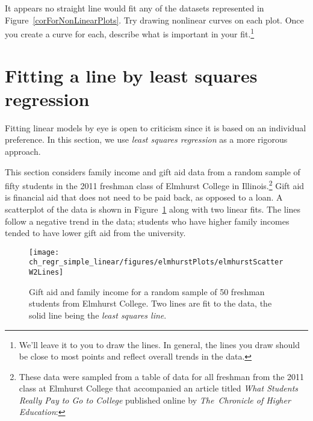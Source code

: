 \begin{exercise}
It appears no straight line would fit any of the datasets represented in Figure~\ref{corForNonLinearPlots}. Try drawing nonlinear curves on each plot. Once you create a curve for each, describe what is important in your fit.\footnote{We'll leave it to you to draw the lines. In general, the lines you draw should be close to most points and reflect overall trends in the data.}
\end{exercise}


\section[Fitting a line by least squares regression]{Fitting a line by least squares regression ~}
\label{fittingALineByLSR}


Fitting linear models by eye is open to criticism since it is based on an individual preference. In this section, we use \emph{least squares regression} as a more rigorous approach.

This section considers family income and gift aid data from a random sample of fifty students in the 2011 freshman class of Elmhurst College in Illinois.\footnote{These data were sampled from a table of data for all freshman from the 2011 class at Elmhurst College that accompanied an article titled \emph{What Students Really Pay to Go to College} published online by \emph{The~Chronicle of Higher Education}: } Gift aid is financial aid that does not need to be paid back, as opposed to a loan. A scatterplot of the data is shown in Figure~\ref{elmhurstScatterW2Lines} along with two linear fits. The lines follow a negative trend in the data; students who have higher family incomes tended to have lower gift aid from the university.

\begin{figure}[h]
\centering
\texttt{[image: ch\_regr\_simple\_linear/figures/elmhurstPlots/elmhurstScatterW2Lines]}
\caption{Gift aid and family income for a random sample of 50 freshman students from Elmhurst College. Two lines are fit to the data, the solid line being the \emph{least squares line}.}
\label{elmhurstScatterW2Lines}
\end{figure}


